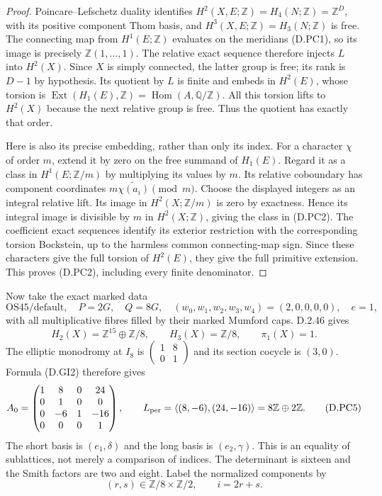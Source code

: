 \begin{proof}
Poincare--Lefschetz duality identifies
$H^2(X,E;\mathbb Z)=H_4(N;\mathbb Z)=\mathbb Z^D$,
with its positive component Thom basis, and
$H^3(X,E;\mathbb Z)=H_3(N;\mathbb Z)$ is free. The connecting
map from $H^1(E;\mathbb Z)$ evaluates on the meridians (D.PC1),
so its image is precisely $\mathbb Z(1,\ldots,1)$.
The relative exact sequence therefore injects $L$ into $H^2(X)$.
Since $X$ is simply connected, the latter group is free; its rank is
$D-1$ by hypothesis. Its quotient by $L$ is finite and embeds in
$H^2(E)$, whose torsion is
$\operatorname{Ext}(H_1(E),\mathbb Z)=\operatorname{Hom}(A,\mathbb Q/\mathbb Z)$.
All this torsion lifts to $H^2(X)$ because the next relative group is
free. Thus the quotient has exactly that order.

Here is also its precise embedding, rather than only its index.
For a character $\chi$ of order $m$, extend it by zero on the free
summand of $H_1(E)$. Regard it as a class in
$H^1(E;\mathbb Z/m)$ by multiplying its values by $m$.
Its relative coboundary has component coordinates
$m\widetilde{\chi(a_i)}\pmod m$. Choose the displayed integers
as an integral relative lift. Its image in $H^2(X;\mathbb Z/m)$
is zero by exactness. Hence its integral image is divisible by $m$
in $H^2(X;\mathbb Z)$, giving the class in (D.PC2).
The coefficient exact sequences identify its exterior restriction
with the corresponding torsion Bockstein, up to the harmless common
connecting-map sign. Since these characters give the full torsion
of $H^2(E)$, they give the full primitive extension. This proves
(D.PC2), including every finite denominator.
\end{proof}

Now take the exact marked data
\[
 \mathrm{OS45/default},\quad P=2G,\quad Q=8G,\quad
 (w_0,w_1,w_2,w_3,w_4)=(2,0,0,0,0),\quad e=1,              \tag{D.PC3}
\]
with all multiplicative fibres filled by their marked Mumford caps.
D.2.46 gives
\[
 H_2(X)=\mathbb Z^{15}\oplus\mathbb Z/8,\qquad
 H_3(X)=\mathbb Z/8,\qquad \pi_1(X)=1.
                                                               \tag{D.PC4}
\]
The elliptic monodromy at $I_8$ is
$\left(\begin{smallmatrix}1&8\\0&1\end{smallmatrix}\right)$
and its section cocycle is $(3,0)$. Formula (D.GI2) therefore gives
\[
 A_0=\begin{pmatrix}
 1&8&0&24\\0&1&0&0\\0&-6&1&-16\\0&0&0&1
 \end{pmatrix},\qquad
 L_{\rm per}=\left\langle(8,-6),(24,-16)\right\rangle
                 =8\mathbb Z\oplus2\mathbb Z.             \tag{D.PC5}
\]
The short basis is $(e_1,\delta)$ and the long basis is $(e_2,\gamma)$.
This is an equality of sublattices, not merely a comparison of
indices. The determinant is sixteen and the Smith factors are two
and eight. Label the normalized components by
\[
             (r,s)\in\mathbb Z/8\times\mathbb Z/2,
             \qquad i=2r+s.                              \tag{D.PC6}
\]

